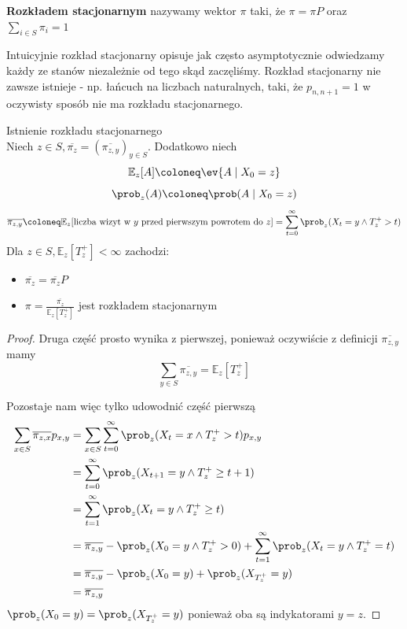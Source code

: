 
\begin{definition}
	\textbf{Rozkładem stacjonarnym} nazywamy wektor \( \pi \) taki, że \( \pi = \pi P \) oraz \( \sum_{i \in S} \pi_i = 1 \)
\end{definition}
Intuicyjnie rozkład stacjonarny opisuje jak często asymptotycznie odwiedzamy każdy ze stanów niezależnie od tego skąd zaczęliśmy. Rozkład stacjonarny nie zawsze istnieje - np. łańcuch na liczbach naturalnych, taki, że \( p_{n, n + 1} = 1\) w oczywisty sposób nie ma rozkładu stacjonarnego.

\begin{theorem} Istnienie rozkładu stacjonarnego\\
	\label{stationary-distribution-existance}
	Niech \(z \in S, \overline{\pi_z} = (\overline{\pi_{z, y}})_{y \in S}\). Dodatkowo niech
	\[
		\mathbb{E}_z[A] \coloneq \ev{A \mid X_0 = z}
	\]
	\[
		\prob_z(A) \coloneq \prob(A \mid X_0 = z)
	\]
	\[
		\overline{\pi_{z, y}} \coloneq \mathbb{E}_z[\text{liczba wizyt w \(y\) przed pierwszym powrotem do \(z\)}] = \sum_{t=0}^{\infty} \prob_z(X_t = y \land T_z^+ > t)
	\]
	Dla \(z \in S, \mathbb{E}_z[T_z^+] < \infty\) zachodzi:
	\begin{itemize}
		\item \(\overline{\pi_z} = \overline{\pi_z} P\)
		\item \(\pi = \frac{\overline{\pi_z}}{\mathbb{E}_z[T_z^+]}\) jest rozkładem stacjonarnym
	\end{itemize}
\end{theorem}
\begin{proof}
	Druga część prosto wynika z pierwszej, ponieważ oczywiście z definicji \(\overline{\pi_{z, y}}\) mamy
	\[
		\sum_{y \in S} \overline{\pi_{z, y}} = \mathbb{E}_z[T_z^+]
	\]

	Pozostaje nam więc tylko udowodnić część pierwszą
	\begin{align*}
		\sum_{x \in S} \overline{\pi_{z, x}} p_{x, y} & = \sum_{x \in S} \sum_{t=0}^{\infty} \prob_z(X_t = x \land T_z^+ > t) p_{x, y}                                  \\
		                                              & = \sum_{t=0}^\infty \prob_z(X_{t+1} = y \land T_z^+ \geq t + 1)                                                 \\
		                                              & = \sum_{t=1}^\infty \prob_z(X_{t} = y \land T_z^+ \geq t)                                                       \\
		                                              & = \overline{\pi_{z, y}} - \prob_z(X_0 = y \land T_z^+ > 0) + \sum_{t=1}^\infty \prob_z(X_t = y \land T_z^+ = t) \\
		                                              & = \overline{\pi_{z, y}} - \prob_z(X_0 = y) + \prob_z(X_{T_z^+} = y)                                             \\
		                                              & = \overline{\pi_{z, y}}
	\end{align*}
	\(\prob_z(X_0 = y) = \prob_z(X_{T_z^+} = y)\) ponieważ oba są indykatorami \(y = z\).
\end{proof}
